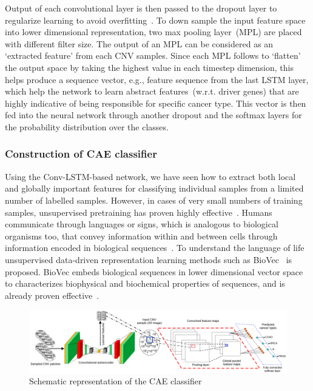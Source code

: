 \hspace*{3.5mm} Output of each convolutional layer is then passed to the dropout layer to regularize learning to avoid overfitting~\cite{vardropout}. To down sample the input feature space into lower dimensional representation, two max pooling layer~(MPL) are placed with different filter size. The output of an MPL can be considered as an `extracted feature' from each CNV samples. Since each MPL follows to `flatten' the output space by taking the highest value in each timestep dimension, this helps produce a sequence vector, e.g., feature sequence from the last LSTM layer, which help the network to learn abstract features~(w.r.t. driver genes) that are highly indicative of being responsible for specific cancer type. This vector is then fed into the neural network  through another dropout and the softmax layers for the probability distribution over the classes. 

\subsubsection{Construction of CAE classifier}
Using the Conv-LSTM-based network, we have seen how to extract both local and globally important features for classifying individual samples from a limited number of labelled samples. However, in cases of very small numbers of training samples, unsupervised pretraining has proven highly effective~\cite{ae1,ae2,ae3}. 
Humans communicate through languages or signs, which is analogous to biological organisms too, that convey information within and between cells through information encoded in biological sequences~\cite{yue2018deep}. To understand the language of life unsupervised data-driven representation learning methods such as BioVec~\cite{asgari2015continuous} is proposed. BioVec embeds biological sequences in lower dimensional vector space to characterizes biophysical and biochemical properties of sequences, and is already proven effective~\cite{yue2018deep}. 

\begin{figure}[h]
	\centering
	\includegraphics[scale=0.6]{images/cae.png}	
    \caption{Schematic representation of the CAE classifier~\cite{karimACCA2019}}
	\label{fig:cae}
\end{figure}


